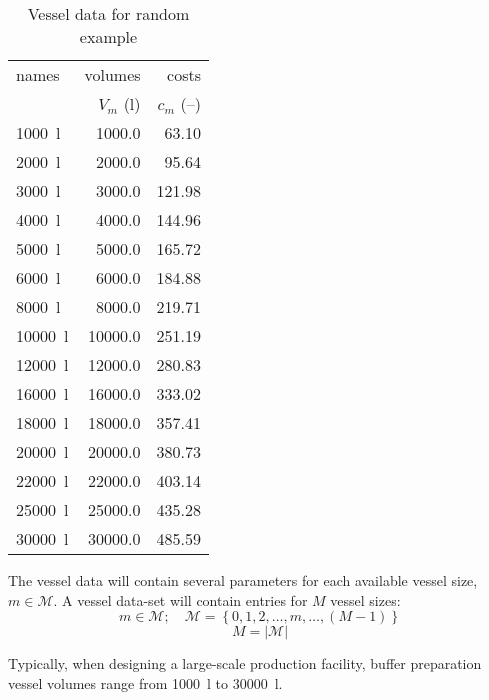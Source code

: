 \begin{table}[h!]
    \centering
    \caption{Vessel data for random example}
    \label{tbl.vessel}
    \begin{tabular}{l | r | r}
        names & volumes & costs\\
        & $V_{m}$ (l) & $c_{m}$ (--)\\\hline
        \SI{1000}{\litre} & \SI{1000.0}{} & \SI{63.10}{}\\
        \SI{2000}{\litre} & \SI{2000.0}{} & \SI{95.64}{}\\
        \SI{3000}{\litre} & \SI{3000.0}{} & \SI{121.98}{}\\
        \SI{4000}{\litre} & \SI{4000.0}{} & \SI{144.96}{}\\
        \SI{5000}{\litre} & \SI{5000.0}{} & \SI{165.72}{}\\
        \SI{6000}{\litre} & \SI{6000.0}{} & \SI{184.88}{}\\
        \SI{8000}{\litre} & \SI{8000.0}{} & \SI{219.71}{}\\
        \SI{10000}{\litre} & \SI{10000.0}{} & \SI{251.19}{}\\
        \SI{12000}{\litre} & \SI{12000.0}{} & \SI{280.83}{}\\
        \SI{16000}{\litre} & \SI{16000.0}{} & \SI{333.02}{}\\
        \SI{18000}{\litre} & \SI{18000.0}{} & \SI{357.41}{}\\
        \SI{20000}{\litre} & \SI{20000.0}{} & \SI{380.73}{}\\
        \SI{22000}{\litre} & \SI{22000.0}{} & \SI{403.14}{}\\
        \SI{25000}{\litre} & \SI{25000.0}{} & \SI{435.28}{}\\
        \SI{30000}{\litre} & \SI{30000.0}{} & \SI{485.59}{}\\
    \end{tabular}
\end{table}

The vessel data will contain several parameters for each available vessel size,
$m \in \mathcal{M}$.
A vessel data-set will contain entries for $M$ vessel sizes:
\begin{equation}
    m \in \mathcal{M}; \quad \mathcal{M} = \left\{ 0, 1, 2, \ldots, m, \ldots,
    \left( M - 1 \right) \right\}
\end{equation}
\begin{equation}
    M = |\mathcal{M}|
\end{equation}

Typically, when designing a large-scale production facility, buffer preparation
vessel volumes range from \SI{1000}{\litre} to \SI{30000}{\litre}.

